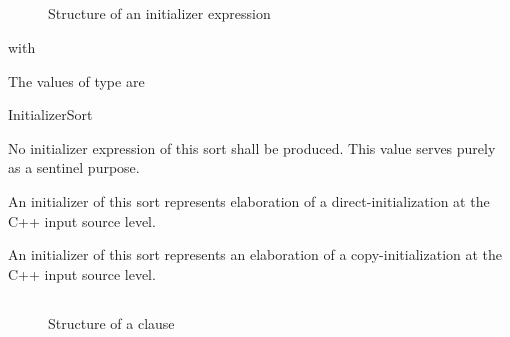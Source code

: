 

\subsection{}
\label{sec:ifc:ExprSort:Initializer}

\begin{figure}[H]
	\centering
	\caption{Structure of an initializer expression}
	\label{fig:ifc-initializer-structure}
\end{figure}
with 

The values of type  are
\begin{SortEnum}{InitializerSort}
\end{SortEnum}

No initializer expression of this sort shall be produced.  This value serves purely as a sentinel purpose.

An initializer of this sort represents elaboration of a direct-initialization at the C++ input source level.

An initializer of this sort represents an elaboration of a copy-initialization at the C++ input source level.



\subsection{}
\label{sec:ifc:ExprSort:Requires}

\begin{figure}[H]
	\centering
	\caption{Structure of a  clause}
	\label{fig:requires-clause-structure}
\end{figure}


